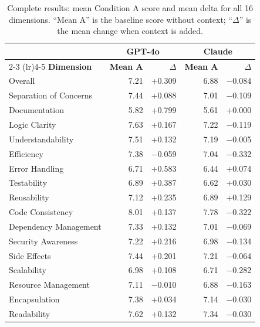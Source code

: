 \documentclass[12pt]{report}
\begin{document}
\begin{table}[htbp]
\centering
\begin{tabular}{lrrrr}
\toprule
& \multicolumn{2}{c}{\textbf{GPT-4o}} & \multicolumn{2}{c}{\textbf{Claude}} \\
\cmidrule(lr){2-3} \cmidrule(lr){4-5}
\textbf{Dimension} & \textbf{Mean A} & \textbf{$\Delta$} & \textbf{Mean A} & \textbf{$\Delta$} \\
\midrule
Overall                & 7.21 & +0.309 & 6.88 & $-$0.084 \\
Separation of Concerns & 7.44 & +0.088 & 7.01 & $-$0.109 \\
Documentation          & 5.82 & +0.799 & 5.61 & +0.000 \\
Logic Clarity          & 7.63 & +0.167 & 7.22 & $-$0.119 \\
Understandability      & 7.51 & +0.132 & 7.19 & $-$0.005 \\
Efficiency             & 7.38 & $-$0.059 & 7.04 & $-$0.332 \\
Error Handling         & 6.71 & +0.583 & 6.44 & +0.074 \\
Testability            & 6.89 & +0.387 & 6.62 & +0.030 \\
Reusability            & 7.12 & +0.235 & 6.89 & +0.129 \\
Code Consistency       & 8.01 & +0.137 & 7.78 & $-$0.322 \\
Dependency Management  & 7.33 & +0.132 & 7.01 & $-$0.069 \\
Security Awareness     & 7.22 & +0.216 & 6.98 & $-$0.134 \\
Side Effects           & 7.44 & +0.201 & 7.21 & $-$0.064 \\
Scalability            & 6.98 & +0.108 & 6.71 & $-$0.282 \\
Resource Management    & 7.11 & $-$0.010 & 6.88 & $-$0.163 \\
Encapsulation          & 7.38 & +0.034 & 7.14 & $-$0.030 \\
Readability            & 7.62 & +0.132 & 7.34 & $-$0.030 \\
\bottomrule
\end{tabular}
\caption{Complete results: mean Condition A score and mean delta for all 16 dimensions. ``Mean A'' is the baseline score without context; ``$\Delta$'' is the mean change when context is added.}
\label{tab:full_results}
\end{table}

\newpage
{}


\end{document}
